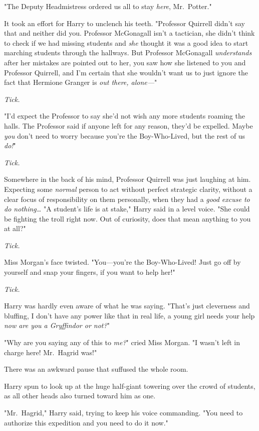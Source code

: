 "The Deputy Headmistress ordered us all to stay \emph{here}, Mr.~Potter."

It took an effort for Harry to unclench his teeth. "Professor Quirrell didn't 
say that and neither did you. Professor McGonagall isn't a tactician, she 
didn't think to check if we had missing students and \emph{she} thought it was 
a good idea to start marching students through the hallways. But Professor 
McGonagall \emph{understands} after her mistakes are pointed out to her, you 
saw how she listened to you and Professor Quirrell, and I'm certain that she 
wouldn't want us to just ignore the fact that Hermione Granger is \emph{out 
there, alone---}"

\emph{Tick.}

"I'd expect the Professor to say she'd not wish any more students roaming the 
halls. The Professor said if anyone left for any reason, they'd be expelled. 
Maybe \emph{you} don't need to worry because you're the Boy-Who-Lived, but the 
rest of us \emph{do!}"

\emph{Tick.}

Somewhere in the back of his mind, Professor Quirrell was just laughing at him. 
Expecting some \emph{normal} person to act without perfect strategic clarity, 
without a clear focus of responsibility on them personally, when they had a 
\emph{good excuse to do nothing{\ldots}} "A student's life is at stake," Harry 
said in a level voice. "She could be fighting the troll right now. Out of 
curiosity, does that mean anything to you at all?"

\emph{Tick.}

Miss Morgan's face twisted. "You---you're the Boy-Who-Lived! Just go off by 
yourself and snap your fingers, if you want to help her!"

\emph{Tick.}

Harry was hardly even aware of what he was saying. "That's just cleverness and 
bluffing, I don't have any power like that in real life, a young girl needs 
your help \emph{now are you a Gryffindor or not?}"

"Why are you saying any of this to \emph{me?}" cried Miss Morgan. "I wasn't 
left in charge here! Mr.~Hagrid was!"

There was an awkward pause that suffused the whole room.

Harry spun to look up at the huge half-giant towering over the crowd of 
students, as all other heads also turned toward him as one.

"Mr.~Hagrid," Harry said, trying to keep his voice commanding. "You need to 
authorize this expedition and you need to do it now."

